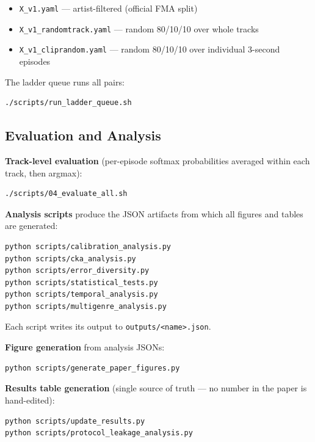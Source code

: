 \documentclass[conference]{IEEEtran}
\providecommand{\tightlist}{\setlength{\itemsep}{0pt}\setlength{\parskip}{0pt}}
\begin{document}
\begin{itemize}
\tightlist
\item
  \texttt{X\_v1.yaml} --- artist-filtered (official FMA split)
\item
  \texttt{X\_v1\_randomtrack.yaml} --- random 80/10/10 over whole
  tracks
\item
  \texttt{X\_v1\_cliprandom.yaml} --- random 80/10/10 over
  individual 3-second episodes
\end{itemize}

The ladder queue runs all pairs:

\begin{verbatim}
./scripts/run_ladder_queue.sh
\end{verbatim}

\subsection{Evaluation and
Analysis}\label{f.-evaluation-and-analysis}

\textbf{Track-level evaluation} (per-episode softmax probabilities
averaged within each track, then argmax):

\begin{verbatim}
./scripts/04_evaluate_all.sh
\end{verbatim}

\textbf{Analysis scripts} produce the JSON artifacts from which all
figures and tables are generated:

\begin{verbatim}
python scripts/calibration_analysis.py
python scripts/cka_analysis.py
python scripts/error_diversity.py
python scripts/statistical_tests.py
python scripts/temporal_analysis.py
python scripts/multigenre_analysis.py
\end{verbatim}

Each script writes its output to
\texttt{outputs/\textless{}name\textgreater{}.json}.

\textbf{Figure generation} from analysis JSONs:

\begin{verbatim}
python scripts/generate_paper_figures.py
\end{verbatim}

\textbf{Results table generation} (single source of truth --- no
number in the paper is hand-edited):

\begin{verbatim}
python scripts/update_results.py
python scripts/protocol_leakage_analysis.py
\end{verbatim}
\end{document}
